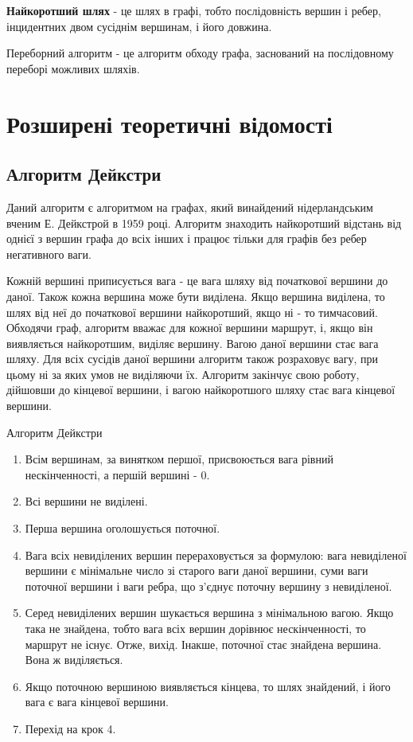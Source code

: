 \textbf{Найкоротший шлях} - це шлях в графі, тобто послідовність вершин і ребер, інцидентних двом сусіднім вершинам, і його довжина.

Переборний алгоритм - це алгоритм обходу графа, заснований на послідовному переборі можливих шляхів.



\section{Розширені теоретичні відомості}
\subsection{Алгоритм Дейкстри}
\nopagebreak[4]

Даний алгоритм є алгоритмом на графах, який винайдений нідерландським вченим Е. Дейкстрой в 1959 році. Алгоритм знаходить найкоротший відстань від однієї з вершин графа до всіх інших і працює тільки для графів без ребер негативного ваги.

Кожній вершині приписується вага - це вага шляху від початкової вершини до даної. Також кожна вершина може бути виділена. Якщо вершина виділена, то шлях від неї до початкової вершини найкоротший, якщо ні - то тимчасовий. Обходячи граф, алгоритм вважає для кожної вершини маршрут, і, якщо він виявляється найкоротшим, виділяє вершину. Вагою даної вершини стає вага шляху. Для всіх сусідів даної вершини алгоритм також розраховує вагу, при цьому ні за яких умов не виділяючи їх. Алгоритм закінчує свою роботу, дійшовши до кінцевої вершини, і вагою найкоротшого шляху стає вага кінцевої вершини.

Алгоритм Дейкстри
\begin{enumerate}
\item Всім вершинам, за винятком першої, присвоюється вага рівний нескінченності, а першій вершині - 0.

\item Всі вершини не виділені.

\item Перша вершина оголошується поточної.

\item Вага всіх невиділених вершин перераховується за формулою: вага невиділеної вершини є мінімальне число зі старого ваги даної вершини, суми ваги поточної вершини і ваги ребра, що з'єднує поточну вершину з невиділеної.

\item Серед невиділених вершин шукається вершина з мінімальною вагою. Якщо така не знайдена, тобто вага всіх вершин дорівнює нескінченності, то маршрут не існує. Отже, вихід. Інакше, поточної стає знайдена вершина. Вона ж виділяється.

\item Якщо поточною вершиною виявляється кінцева, то шлях знайдений, і його вага є вага кінцевої вершини.

\item Перехід на крок 4.
\end{enumerate}

